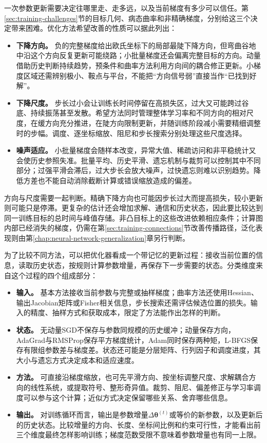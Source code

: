 一次参数更新需要决定往哪里走、走多远，以及当前梯度有多少可以信任。第\ref{sec:training-challenges}节的目标几何、病态曲率和非精确梯度，分别给这三个决定带来困难。优化方法希望改善的性质可以据此列出：
\begin{itemize}
  \item \textbf{下降方向。} 负的完整梯度给出欧氏坐标下的局部最陡下降方向，但弯曲谷地中沿这个方向反复更新可能绕路；小批量梯度还会偏离完整目标的方向。动量借助历史判断持续趋势，预条件和曲率方法利用方向间的耦合修正更新。小梯度区域还需辨别极小、鞍点与平台，不能把“方向信号弱”直接当作“已找到好解”。
  \item \textbf{下降尺度。} 步长过小会让训练长时间停留在高损失区，过大又可能跨过谷底、持续振荡甚至发散。希望方法同时管理整体学习率和不同方向的相对尺度，在缓方向充分推进，在陡方向限制更新，并随训练阶段减小需要精细调整时的步幅。调度、逐坐标缩放、阻尼和步长搜索分别处理这些尺度选择。
  \item \textbf{噪声适应。} 小批量梯度会随样本改变，异常大值、稀疏访问和非平稳统计又会使历史参照失准。批量平均、历史平滑、遗忘机制与裁剪可以控制其中不同部分；过强平滑会滞后，过大步长会放大噪声，过快遗忘则难以识别趋势。降低方差也不能自动消除截断计算或错误缩放造成的偏差。
\end{itemize}
方向与尺度需要一起判断。精确下降方向也可能因步长过大而提高损失，较小更新则可能只是停滞。更复杂的估计还会增加求解、通信和历史状态，因此要比较达到同一训练目标的总时间与峰值存储。非凸目标上的这些改进依赖相应条件；计算图内部已经消失的梯度，仍需在第\ref{sec:training-connections}节改善传播路径，泛化表现则由第\ref{chap:neural-network-generalization}章另行判断。

为了比较不同方法，可以把优化器看成一个带记忆的更新过程：接收当前位置的信息，读取历史状态，按规则计算参数增量，再保存下一步需要的状态。分类维度来自这个过程的四个组成部分：
\begin{itemize}
  \item \textbf{输入。} 基本方法接收当前参数与完整或抽样梯度；曲率方法还使用Hessian、输出Jacobian矩阵或Fisher相关信息，步长搜索还需评估候选位置的损失。输入的精度、抽样方式和获取成本，限定了方法能作出怎样的判断。
  \item \textbf{状态。} 无动量SGD不保存与参数同规模的历史缓冲；动量保存方向，AdaGrad与RMSProp保存平方梯度统计，Adam同时保存两种矩，L-BFGS保存有限组参数差与梯度差。状态还可能是分层矩阵、行列因子和调度进度，其大小与遗忘方式决定成本和适应速度。
  \item \textbf{方法。} 可直接沿梯度缩放，也可先平滑方向、按坐标调整尺度、求解耦合方向的线性系统，或提取符号、整形奇异值。裁剪、阻尼、偏差修正与学习率调度可以参与这个计算；近似方式决定保留哪些关系、舍弃哪些信息。
  \item \textbf{输出。} 对训练循环而言，输出是参数增量$\Delta\bm\theta^{(t)}$或等价的新参数，以及更新后的历史状态。比较增量的方向、长度、坐标间比例和约束可行性，才能看出前三个维度最终怎样影响训练；梯度范数受限不意味着参数增量也有同一上限。
\end{itemize}

